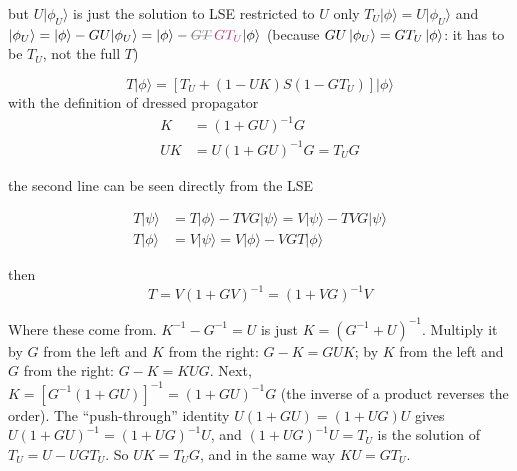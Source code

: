 \documentclass[11pt,a4paper]{article}
\newcommand{\ai}[1]{\textcolor{aicolor}{#1}}
\newcommand{\aifixm}[2]{\textcolor{gray}{\text{\sout{$#1$}}}\,\textcolor{aicolor}{#2}}
\newcommand{\ai}[1]{#1}
\newcommand{\aifixm}[2]{#2}
\newenvironment{aiadd}{\par}{\par}
\begin{document}
but $U\lvert \phi_U \rangle$ is just the solution to LSE restricted to $U$ only $T_U\lvert \phi \rangle = U\lvert \phi_U \rangle$ and $\lvert \phi_U \rangle = \lvert \phi \rangle - GU\lvert \phi_U \rangle = \lvert \phi \rangle - \aifixm{GT}{GT_U}\lvert \phi \rangle$ \ai{(because $GU\ket{\phi_U}=GT_U\ket\phi$: it has to be $T_U$, not the full $T$)}

\[
	T\lvert \phi \rangle = \left[T_U + (1 - UK)S(1 - GT_U)\right]\lvert \phi \rangle
\]
with the definition of dressed propagator
\begin{align}
	K  & = (1 + GU)^{-1}G         \\
	UK & = U(1 + GU)^{-1}G = T_UG
\end{align}

the second line can be seen directly from the LSE

\begin{align}
	T\lvert \psi \rangle & = T\lvert \phi \rangle - TVG\lvert \psi \rangle = V\lvert \psi \rangle - TVG\lvert \psi \rangle \\
	T\lvert \phi \rangle & = V\lvert \psi \rangle = V\lvert \phi \rangle - VGT\lvert \phi \rangle
\end{align}

then
\[
	T = V(1 + GV)^{-1}=(1 + VG)^{-1}V
\]



\begin{aiadd}
	Where these come from. $K^{-1}-G^{-1}=U$ is just $K=(G^{-1}+U)^{-1}$. Multiply it by $G$ from the left and $K$ from the right: $G-K=GUK$; by $K$ from the left and $G$ from the right: $G-K=KUG$. Next, $K=[G^{-1}(1+GU)]^{-1}=(1+GU)^{-1}G$ (the inverse of a product reverses the order). The ``push-through'' identity $U(1+GU)=(1+UG)U$ gives $U(1+GU)^{-1}=(1+UG)^{-1}U$, and $(1+UG)^{-1}U=T_U$ is the solution of $T_U=U-UGT_U$. So $UK=T_UG$, and in the same way $KU=GT_U$.
\end{aiadd}
\end{document}

